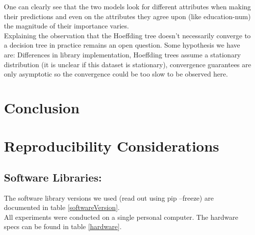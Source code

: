 \documentclass[conference]{IEEEtran}
\begin{document}
One can clearly see that the two models look for different attributes when making their predictions and even on the attributes they agree upon (like education-num) the magnitude of their importance varies.\\
Explaining the observation that the Hoeffding tree doesn't necessarily converge to a decision tree in practice remains an open question.
Some hypothesis we have are: Differences in library implementation, Hoeffding trees assume a stationary distribution (it is unclear if this dataset is stationary), convergence guarantees are only asymptotic so the convergence could be too slow to be observed here.



\section{Conclusion}

\section{Reproducibility Considerations} 
\label{Reproducibility}

\subsection{Software Libraries:}
The software library versions we used (read out using pip --freeze) are documented in table \ref{softwareVersion}.\\
All experiments were conducted on a single personal computer. The hardware specs can be found in table \ref{hardware}.\\
\end{document}
